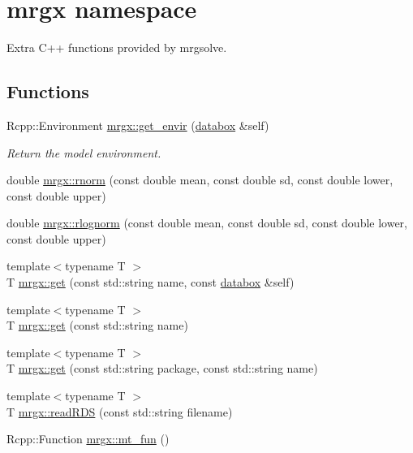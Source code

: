\hypertarget{group__mrgx}{}\section{mrgx namespace}
\label{group__mrgx}


Extra C++ functions provided by mrgsolve.  


\subsection*{Functions}
\begin{DoxyCompactItemize}
\item 
Rcpp\+::\+Environment \hyperlink{group__mrgx_gac0f9d86256f3cb47f9ae798d63c99977}{mrgx\+::get\+\_\+envir} (\hyperlink{structdatabox}{databox} \&self)
\begin{DoxyCompactList}\small\item\em Return the model environment. \end{DoxyCompactList}\item 
double \hyperlink{group__mrgx_ga16f34933e13e4ac7dce686161578759f}{mrgx\+::rnorm} (const double mean, const double sd, const double lower, const double upper)
\item 
double \hyperlink{group__mrgx_ga4d965868d96d9afa2164f500c2c57ca4}{mrgx\+::rlognorm} (const double mean, const double sd, const double lower, const double upper)
\item 
{\footnotesize template$<$typename T $>$ }\\T \hyperlink{group__mrgx_gab71fd80e9da8f4192219a9e258d2aab5}{mrgx\+::get} (const std\+::string name, const \hyperlink{structdatabox}{databox} \&self)
\item 
{\footnotesize template$<$typename T $>$ }\\T \hyperlink{group__mrgx_ga0500d813d7ce3a3c4c4a83e4d1dc4c31}{mrgx\+::get} (const std\+::string name)
\item 
{\footnotesize template$<$typename T $>$ }\\T \hyperlink{group__mrgx_ga941a4a510630bc60e9963ddc18cfebdf}{mrgx\+::get} (const std\+::string package, const std\+::string name)
\item 
{\footnotesize template$<$typename T $>$ }\\T \hyperlink{group__mrgx_ga554f6cbf063e3b13452e510f5ca1cb95}{mrgx\+::read\+R\+DS} (const std\+::string filename)
\item 
Rcpp\+::\+Function \hyperlink{group__mrgx_ga7f1beb36722634cc4ad7d28ccdedc80d}{mrgx\+::mt\+\_\+fun} ()
\end{DoxyCompactItemize}


